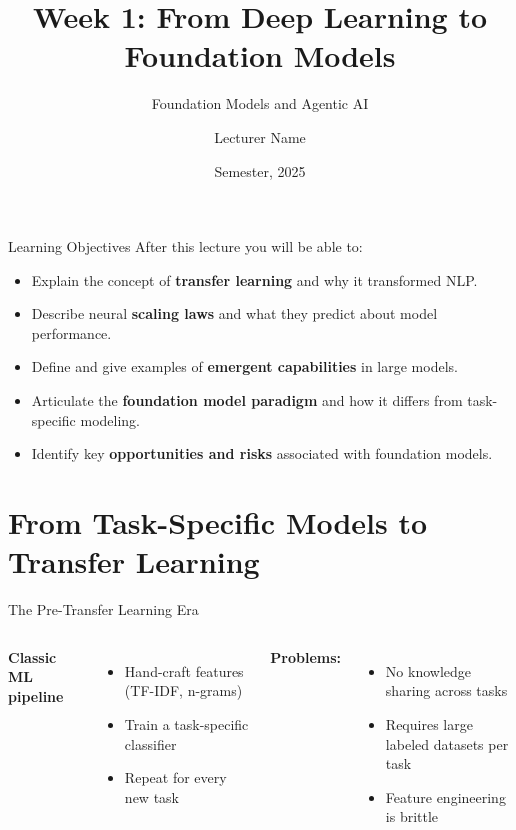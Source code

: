 \documentclass[aspectratio=169,10pt]{beamer}
\title{Week 1: From Deep Learning to Foundation Models}
\subtitle{Foundation Models and Agentic AI}
\author{Lecturer Name}
\institute{Holon Institute of Technology (HIT)}
\date{Semester, 2025}
\begin{document}
\begin{frame}
  \titlepage
\end{frame}

\begin{frame}{Learning Objectives}
  After this lecture you will be able to:
  \begin{itemize}
    \item Explain the concept of \textbf{transfer learning} and why it transformed NLP.
    \item Describe neural \textbf{scaling laws} and what they predict about model performance.
    \item Define and give examples of \textbf{emergent capabilities} in large models.
    \item Articulate the \textbf{foundation model paradigm} and how it differs from task-specific modeling.
    \item Identify key \textbf{opportunities and risks} associated with foundation models.
  \end{itemize}
\end{frame}

\section{From Task-Specific Models to Transfer Learning}


\begin{frame}{The Pre-Transfer Learning Era}
  \begin{columns}[T]
      \textbf{Classic ML pipeline}
      \begin{itemize}
        \item Hand-craft features (TF-IDF, n-grams)
        \item Train a task-specific classifier
        \item Repeat for every new task
      \end{itemize}
      \vspace{0.5em}
      \textbf{Problems:}
      \begin{itemize}
        \item No knowledge sharing across tasks
        \item Requires large labeled datasets per task
        \item Feature engineering is brittle
      \end{itemize}
  \end{columns}
\end{frame}
\end{document}
